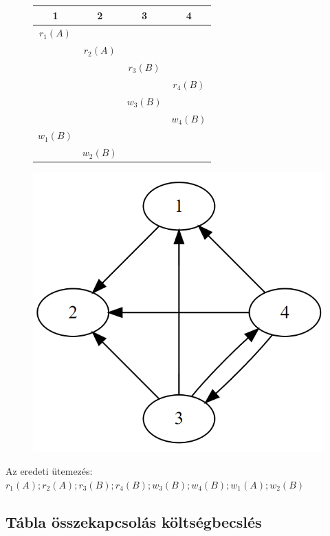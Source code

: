 \documentclass[12pt,a4paper]{article}
\begin{document}
\begin{figure}[h!]
	\centering
	\begin{minipage}{0.5\textwidth}
	\centering
	\begin{tabular}{|c|c|c|c|}
		\hline
		1 & 2 & 3 & 4 \\
		\hline
		$r_1(A)$ & & & \\
		\hline
		& $r_2(A)$ & & \\
		\hline
		& & $r_3(B)$ & \\
		\hline
		& & & $r_4(B)$ \\
		\hline
		& & $w_3(B)$ & \\
		\hline
		& & & $w_4(B)$ \\
		\hline
		$w_1(B)$ & & & \\
		\hline
		& $w_2(B)$ & & \\
		\hline
	\end{tabular}
	\end{minipage}%
	\begin{minipage}{0.5\textwidth}
		\centering
		\includegraphics[width=0.75\linewidth]{"megelőzési-gráf"}
	\end{minipage}
\end{figure}

\begin{outline}
	\1 Az eredeti ütemezés:\\
	$r_1(A);r_2(A);r_3(B);r_4(B);w_3(B);w_4(B);w_1(A);w_2(B)$
\end{outline}

\pagebreak

\subsection{Tábla összekapcsolás költségbecslés}
\end{document}
